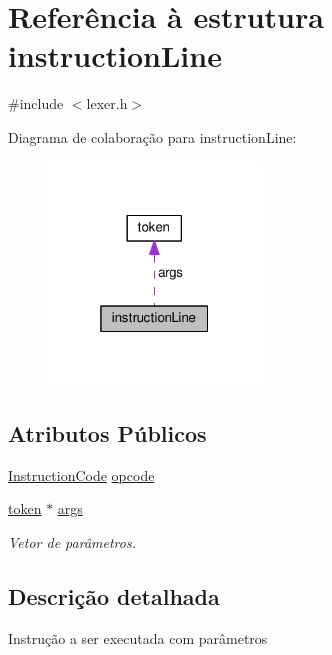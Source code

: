 \hypertarget{structinstruction_line}{\section{Referência à estrutura instruction\-Line}
\label{structinstruction_line}
}


{\ttfamily \#include $<$lexer.\-h$>$}



Diagrama de colaboração para instruction\-Line\-:\nopagebreak
\begin{figure}[H]
\begin{center}
\leavevmode
\includegraphics[width=160pt]{structinstruction_line__coll__graph}
\end{center}
\end{figure}
\subsection*{Atributos Públicos}
\begin{DoxyCompactItemize}
\item 
\hyperlink{languagedefinition_8h_a1830ff5737e4f1610e975ee2aa489206}{Instruction\-Code} \hyperlink{structinstruction_line_a309feca274873683d12f90cf0bd81780}{opcode}
\item 
\hyperlink{structtoken}{token} $\ast$ \hyperlink{structinstruction_line_ab6b4be43f89da78d09a9469f952435c7}{args}
\begin{DoxyCompactList}\small\item\em Vetor de parâmetros. \end{DoxyCompactList}\end{DoxyCompactItemize}


\subsection{Descrição detalhada}
Instrução a ser executada com parâmetros 

